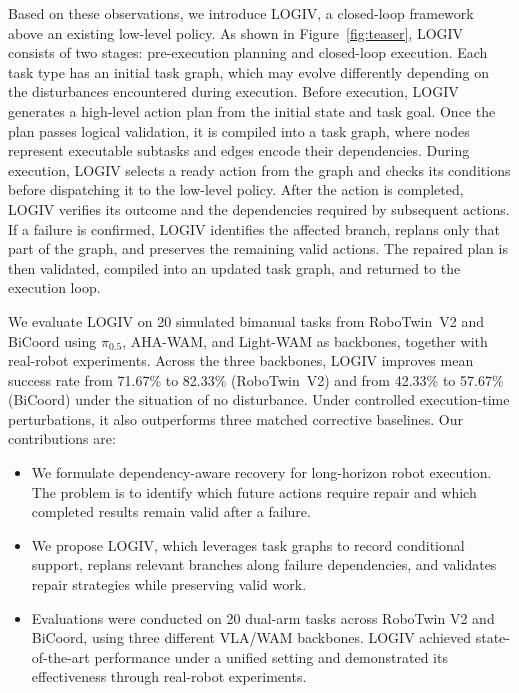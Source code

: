 \documentclass[letterpaper,10pt,conference]{ieeeconf}
\newcommand{\method}{LOGIV\xspace}
\begin{document}
Based on these observations, we introduce \method, a closed-loop framework above an existing low-level policy. As shown in Figure~\ref{fig:teaser}, \method consists of two stages: pre-execution planning and closed-loop execution. Each task type has an initial task graph, which may evolve differently depending on the disturbances encountered during execution. Before execution, \method generates a high-level action plan from the initial state and task goal. Once the plan passes logical validation, it is compiled into a task graph, where nodes represent executable subtasks and edges encode their dependencies. During execution, \method selects a ready action from the graph and checks its conditions before dispatching it to the low-level policy. After the action is completed, \method verifies its outcome and the dependencies required by subsequent actions. If a failure is confirmed, LOGIV identifies the affected branch, replans only that part of the graph, and preserves the remaining valid actions. The repaired plan is then validated, compiled into an updated task graph, and returned to the execution loop.

We evaluate \method on 20 simulated bimanual tasks from RoboTwin~V2 and BiCoord using $\pi_{0.5}$, AHA-WAM, and Light-WAM as backbones, together with real-robot experiments. Across the three backbones, \method improves mean success rate from 71.67\% to 82.33\% (RoboTwin~V2) and from 42.33\% to 57.67\% (BiCoord) under the situation of no disturbance. Under controlled execution-time perturbations, it also outperforms three matched corrective baselines. Our contributions are:
\begin{itemize}
  \setlength{\itemsep}{0pt}
  \setlength{\topsep}{2pt}
  \item We formulate dependency-aware recovery for long-horizon robot execution. The problem is to identify which future actions require repair and which completed results remain valid after a failure.
  \item We propose \method, which leverages task graphs to record conditional support, replans relevant branches along failure dependencies, and validates repair strategies while preserving valid work.
  \item Evaluations were conducted on 20 dual-arm tasks across RoboTwin V2 and BiCoord, using three different VLA/WAM backbones. LOGIV achieved state-of-the-art performance under a unified setting and demonstrated its effectiveness through real-robot experiments.
\end{itemize}
\end{document}
